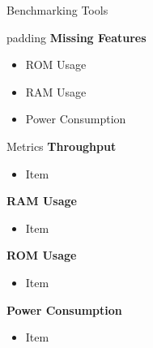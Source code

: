 \documentclass[xcolor=pdftex,dvipsnames,table,final]{beamer}
\begin{document}
\begin{frame}[fragile]{}
\begin{columns}[t]
\begin{column}{.31\linewidth}
\begin{block}{Benchmarking Tools}
        \begin{center}
        \begin{minipage}[t]{0.9\linewidth}  
        \begin{beamercolorbox}[rounded=true]{padding}
          \textbf{Missing Features}
          \begin{itemize}
            \item ROM Usage
            \item RAM Usage
            \item Power Consumption
          \end{itemize}
        \end{beamercolorbox}
        \end{minipage}
        \end{center}
      \end{block}
      \begin{block}{Metrics}
        {\large\textbf{Throughput}}
        \begin{itemize}
          \item Item 
        \end{itemize}
        {\large\textbf{RAM Usage}}
        \begin{itemize}
          \item Item 
        \end{itemize}
        {\large\textbf{ROM Usage}}
        \begin{itemize}
          \item Item 
        \end{itemize}
        {\large\textbf{Power Consumption}}
        \begin{itemize}
          \item Item 
        \end{itemize}
      \end{block}
        
    \end{column}
    \begin{column}{.31\linewidth}
   
      

\end{column}
\end{columns}
\end{frame}
\end{document}
